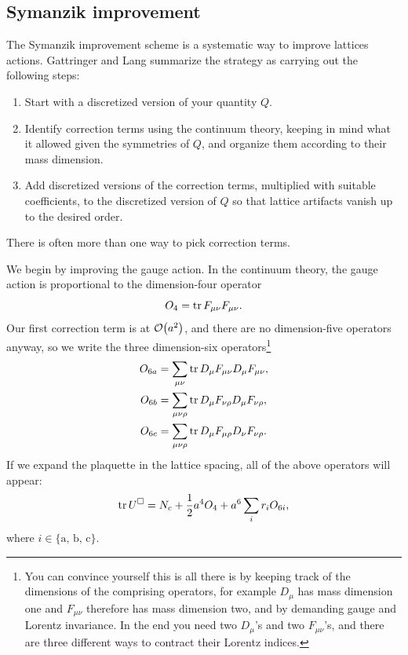 \subsection{Symanzik improvement}\label{sec:symanzikImprovement}

The Symanzik improvement scheme \cite{symanzik_continuum_1983,
symanzik_continuum_1983-1,curci_symanziks_1983,luscher_shell_1985} 
is a systematic way to
improve lattices actions. Gattringer and Lang summarize the strategy as
carrying out the following steps:
\begin{enumerate}
  \item Start with a discretized version of your quantity $Q$.
  \item Identify correction terms using the continuum theory, keeping in mind
        what it allowed given the symmetries of $Q$, and organize them according
        to their mass dimension.
  \item Add discretized versions of the correction terms, multiplied with
        suitable coefficients, to the discretized version of $Q$ so that 
        lattice artifacts vanish up to the desired order.
\end{enumerate}
There is often more than one way to pick correction terms.

We begin by improving the gauge action. In the continuum theory, the gauge
action is proportional to the dimension-four operator
\begin{equation}
  O_4 = \tr F_{\mu\nu}F_{\mu\nu}.
\end{equation}
Our first correction term is at $\order{a^2}$, and there are no dimension-five
operators anyway, so we write the three dimension-six operators\footnote{You 
can convince yourself this is all there is by keeping track of the
dimensions of the comprising operators, for example $D_\mu$ has mass dimension
one and $F_{\mu\nu}$ therefore has mass dimension two, and by demanding gauge
and Lorentz invariance. In the end you need two $D_\mu$'s and two 
$F_{\mu\nu}$'s, and there are three different ways to contract their 
Lorentz indices.}
\begin{equation}\begin{aligned}
  O_{6a}&=\sum_{\mu\nu}\tr D_\mu F_{\mu\nu} D_\mu F_{\mu\nu},\\
  O_{6b}&=\sum_{\mu\nu\rho}\tr D_\mu F_{\nu\rho} D_\mu F_{\nu\rho},\\
  O_{6c}&=\sum_{\mu\nu\rho}\tr D_\mu F_{\mu\rho} D_\nu F_{\nu\rho}.
\end{aligned}\end{equation}
If we expand the plaquette in the lattice spacing, all of the above
operators will appear:
\begin{equation}
  \tr U^\square = N_c + \frac{1}{2}a^4O_4+a^6\sum_i r_iO_{6i},
\end{equation}
where $i\in\{\text{a, b, c}\}$.

